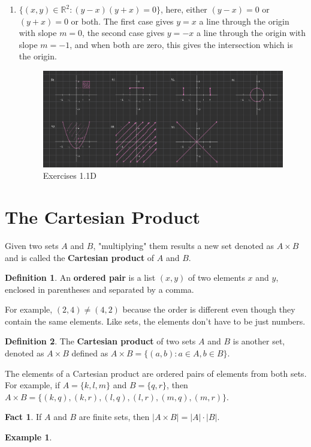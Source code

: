 \documentclass[10pt]{article}
\newcommand{\R}{\mathbb{R}}
\theoremstyle{definition}
\newtheorem{example}{Example}
\newtheorem{definition}{Definition}
\newtheorem{fact}{Fact}
\begin{document}
\begin{enumerate}[label=\Alph*.]
\begin{enumerate}[label=\arabic*.]
            \item $\{(x,y)\in\R^2:(y-x)(y+x)=0\}$, here, either $(y-x)=0$ or $(y+x)=0$ or both. The first case gives $y=x$ a line through the origin with slope $m=0$, the second case gives $y=-x$ a line through the origin with slope $m=-1$, and when both are zero, this gives the intersection which is the origin.
                \begin{figure}
                    \centering
                    \includegraphics[width=0.75\linewidth]{images/exercise_1_1_D.jpg}
                    \caption{Exercises 1.1D}
                \end{figure}
        \end{enumerate}
\end{enumerate}

\section{The Cartesian Product}

Given two sets $A$ and $B$, "multiplying" them results a new set denoted as $A\times B$ and is called the \textbf{Cartesian product} of $A$ and $B$.

\begin{definition}
    An \textbf{ordered pair} is a list $(x,y)$ of two elements $x$ and $y$, enclosed in parentheses and separated by a comma.
\end{definition}

For example, $(2,4) \neq (4,2)$ because the order is different even though they contain the same elements. Like sets, the elements don't have to be just numbers.

\begin{definition}
    The \textbf{Cartesian product} of two sets $A$ and $B$ is another set, denoted as $A\times B$ defined as $A \times B = \{ (a,b) : a\in A, b\in B\}$.
\end{definition}

The elements of a Cartesian product are ordered pairs of elements from both sets. For example, if $A = \{k,l,m\}$ and $B = \{q,r\}$, then $A \times B = \{(k,q),(k,r),(l,q),(l,r),(m,q),(m,r)\}$.

\begin{fact}
If $A$ and $B$ are finite sets, then $\left| A \times B\right| = \lvert A \rvert \cdot \lvert B \rvert$.
\end{fact}

\begin{example}
    
\end{example}

\end{document}
